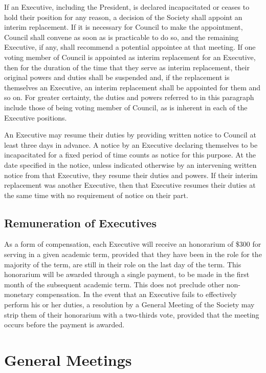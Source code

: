 If an Executive, including the President, is declared incapacitated or ceases to
hold their position for any reason, a decision of the Society shall appoint an
interim replacement. If it is necessary for Council to make the appointment,
Council shall convene as soon as is practicable to do so, and the remaining
Executive, if any, shall recommend a potential appointee at that meeting. If one
voting member of Council is appointed as interim replacement for an Executive,
then for the duration of the time that they serve as interim replacement, their
original powers and duties shall be suspended and, if the replacement is
themselves an Executive, an interim replacement shall be appointed for them and
so on. For greater certainty, the duties and powers referred to in this
paragraph include those of being voting member of Council, as is inherent in
each of the Executive positions.

An Executive may resume their duties by providing written notice to Council at
least three days in advance. A notice by an Executive declaring themselves to be
incapacitated for a fixed period of time counts as notice for this purpose. At
the date specified in the notice, unless indicated otherwise by an intervening
written notice from that Executive, they resume their duties and powers. If
their interim replacement was another Executive, then that Executive resumes
their duties at the same time with no requirement of notice on their part.

\subsection{Remuneration of Executives}
As a form of compensation, each Executive will receive an honorarium of \$300
for serving in a given academic term, provided that they have been in the role
for the majority of the term, are still in their role on the last day of the
term. This honorarium will be awarded through a single payment, to be made in
the first month of the subsequent academic term. This does not preclude other
non-monetary compensation. In the event that an Executive fails to effectively
perform his or her duties, a resolution by a General Meeting of the Society may
strip them of their honorarium with a two-thirds vote, provided that the meeting
occurs before the payment is awarded.

\section{General Meetings}
